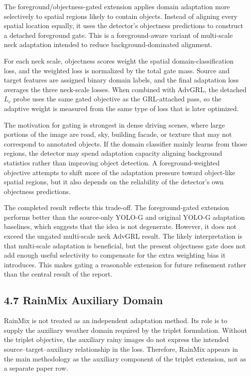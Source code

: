 \documentclass[
  11pt,
]{article}
\begin{document}
The foreground/objectness-gated extension applies domain adaptation more
selectively to spatial regions likely to contain objects. Instead of
aligning every spatial location equally, it uses the detector's
objectness predictions to construct a detached foreground gate. This is
a foreground-aware variant of multi-scale neck adaptation intended to
reduce background-dominated alignment.

For each neck scale, objectness scores weight the spatial
domain-classification loss, and the weighted loss is normalized by the
total gate mass. Source and target features are assigned binary domain
labels, and the final adaptation loss averages the three neck-scale
losses. When combined with AdvGRL, the detached \(L_c\) probe uses the
same gated objective as the GRL-attached pass, so the adaptive weight is
measured from the same type of loss that is later optimized.

The motivation for gating is strongest in dense driving scenes, where
large portions of the image are road, sky, building facade, or texture
that may not correspond to annotated objects. If the domain classifier
mainly learns from those regions, the detector may spend adaptation
capacity aligning background statistics rather than improving object
detection. A foreground-weighted objective attempts to shift more of the
adaptation pressure toward object-like spatial regions, but it also
depends on the reliability of the detector's own objectness predictions.

The completed result reflects this trade-off. The foreground-gated
extension performs better than the source-only YOLO-G and original
YOLO-G adaptation baselines, which suggests that the idea is not
degenerate. However, it does not exceed the ungated multi-scale neck
AdvGRL result. The likely interpretation is that multi-scale adaptation
is beneficial, but the present objectness gate does not add enough
useful selectivity to compensate for the extra weighting bias it
introduces. This makes gating a reasonable extension for future
refinement rather than the central result of the report.

\hypertarget{rainmix-auxiliary-domain}{%
\subsection{4.7 RainMix Auxiliary
Domain}\label{rainmix-auxiliary-domain}}

RainMix is not treated as an independent adaptation method. Its role is
to supply the auxiliary weather domain required by the triplet
formulation. Without the triplet objective, the auxiliary rainy images
do not express the intended source--target--auxiliary relationship in
the loss. Therefore, RainMix appears in the main methodology as the
auxiliary component of the triplet extension, not as a separate paper
row.
\end{document}
